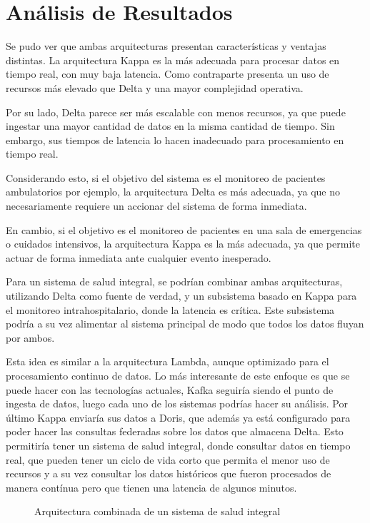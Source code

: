 \section{Análisis de Resultados}

Se pudo ver que ambas arquitecturas presentan características y ventajas distintas. 
La arquitectura Kappa es la más adecuada para procesar datos en tiempo real, con muy baja latencia. 
Como contraparte presenta un uso de recursos más elevado que Delta y una mayor complejidad operativa.

Por su lado, Delta parece ser más escalable con menos recursos, 
ya que puede ingestar una mayor cantidad de datos en la misma cantidad de tiempo.
Sin embargo, sus tiempos de latencia lo hacen inadecuado para procesamiento en tiempo real. 

Considerando esto, si el objetivo del sistema es el monitoreo de pacientes ambulatorios por ejemplo, 
la arquitectura Delta es más adecuada, ya que no necesariamente requiere un accionar del sistema de forma inmediata.

En cambio, si el objetivo es el monitoreo de pacientes en una sala de emergencias o cuidados intensivos,
la arquitectura Kappa es la más adecuada, ya que permite actuar de forma inmediata ante cualquier evento inesperado.

Para un sistema de salud integral, se podrían combinar ambas arquitecturas, 
utilizando Delta como fuente de verdad, y un subsistema basado en Kappa para el monitoreo intrahospitalario,
donde la latencia es crítica. 
Este subsistema podría a su vez alimentar al sistema principal de modo que todos los datos fluyan por ambos.

Esta idea es similar a la arquitectura Lambda, aunque optimizado para el procesamiento continuo de datos.
Lo más interesante de este enfoque es que se puede hacer con las tecnologías actuales,
Kafka seguiría siendo el punto de ingesta de datos, 
luego cada uno de los sistemas podrías hacer su análisis. Por último Kappa enviaría sus datos a Doris, 
que además ya está configurado para poder hacer las consultas federadas sobre los datos que almacena Delta. 
Esto permitiría tener un sistema de salud integral, 
donde consultar datos en tiempo real, que pueden tener un ciclo de vida corto que permita el menor uso de recursos 
y a su vez consultar los datos históricos que fueron procesados de manera contínua pero que tienen una latencia de 
algunos minutos. 

\begin{figure}[h]
    \caption{Arquitectura combinada de un sistema de salud integral} 
    \label{fig:des_arquitectura_combinada}
\end{figure}